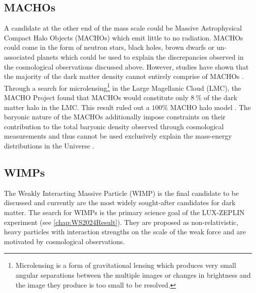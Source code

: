 \subsection{MACHOs}\label{sec:DMOverview/MACHOs}
A candidate at the other end of the mass scale could be Massive Astrophysical Compact Halo Objects (MACHOs) which emit little to no radiation. MACHOs could come in the form of neutron stars, black
holes, brown dwarfs or un-associated planets which could be used to explain the discrepancies observed in the cosmological observations discussed above. However, studies have shown that the majority of the dark matter density cannot entirely comprise of MACHOs \cite{Becker:2004ni,MicroLens}. Through a search for microlensing\footnote{Microlensing is a form of gravitational lensing which produces very small angular separations between the multiple images or changes in brightness and the image they produce is too small to be resolved.} in the Large Magellanic Cloud (LMC), the MACHO Project found that MACHOs would constitute only $8~\%$ of the dark matter halo in the LMC. This result ruled out a $100\%$ MACHO halo model \cite{MicroLens}.
The baryonic nature of the MACHOs additionally impose constraints on their contribution to the total baryonic density observed through cosmological measurements and thus cannot be used exclusively explain the mass-energy distributions in the Universe \cite{Planck2018}.

\subsection{WIMPs}\label{sec:DMOverview/WIMPs}
The Weakly Interacting Massive Particle (WIMP) is the final candidate to be discussed and currently are the most widely sought-after candidates for dark matter. The search for WIMPs is the primary science goal of the LUX-ZEPLIN experiment (see \autoref{chap:WS2024Result}). They are proposed as non-relativistic, heavy particles with interaction strengths on the scale of the weak force and are motivated by cosmological observations.

